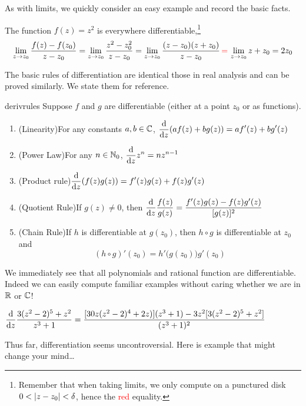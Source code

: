 As with limits, we quickly consider an easy example and record the basic facts.

\begin{example}{}{}
The function $f(z)=z^2$ is everywhere differentiable,\footnote{Remember that when taking limits, we only compute on a punctured disk $0<\left| z-z_0\right|<\delta$, hence the \textcolor{red}{red} equality.}
  \[\lim_{z\to z_0}\frac{f(z)-f(z_0)}{z-z_0}= \lim_{z\to z_0}\frac{z^2-z_0^2}{z-z_0} =\lim_{z\to z_0}\frac{(z-z_0)(z+z_0)}{z-z_0} \textcolor{red}{\,=\,} \lim_{z\to z_0}z+z_0=2z_0\]
\end{example}

The basic rules of differentiation are identical those in real analysis and can be proved similarly. We state them for reference.

\begin{thm}{}{derivrules}
Suppose $f$ and $g$ are differentiable (either at a point $z_0$ or as functions).
\begin{enumerate}
  \item (Linearity)\quad For any constants $a,b\in\mathbb{C}$, $\displaystyle\frac{\mathrm{d} }{\mathrm{d} z}(af(z)+bg(z))=af'(z)+bg'(z)$
  \item (Power Law)\quad For any $n\in\mathbb{N}_0$, $\displaystyle\frac{\mathrm{d} }{\mathrm{d} z}z^n=nz^{n-1}$
  \item (Product rule)\quad $\displaystyle\frac{\mathrm{d} }{\mathrm{d} z}(f(z)g(z))=f'(z)g(z)+f(z)g'(z)$
  \item (Quotient Rule)\quad If $g(z)\neq 0$, then $\displaystyle\frac{\mathrm{d} }{\mathrm{d} z}\frac{f(z)}{g(z)}=\frac{f'(z)g(z)-f(z)g'(z)}{[g(z)]^2}$
  \item (Chain Rule)\quad If $h$ is differentiable at $g(z_0)$, then $h\circ g$ is differentiable at $z_0$ and
  \[(h\circ g)'(z_0)=h'\bigl(g(z_0)\bigr)g'(z_0)\]
\end{enumerate}
\end{thm}

We immediately see that all polynomials and rational function are differentiable. Indeed we can easily compute familiar examples without caring whether we are in $\mathbb{R}$ or $\mathbb{C}$!
\begin{example}{}{}
  $\displaystyle\frac{\mathrm{d} }{\mathrm{d} z}\frac{3(z^2-2)^5+z^2}{z^3+1} = \frac{[30z(z^2-2)^4+2z)](z^3+1) -3z^2[3(z^2-2)^5+z^2]}{(z^3+1)^2}$
\end{example}


\vfil\goodbreak



Thus far, differentiation seems uncontroversial. Here is example that might change your mind\ldots

